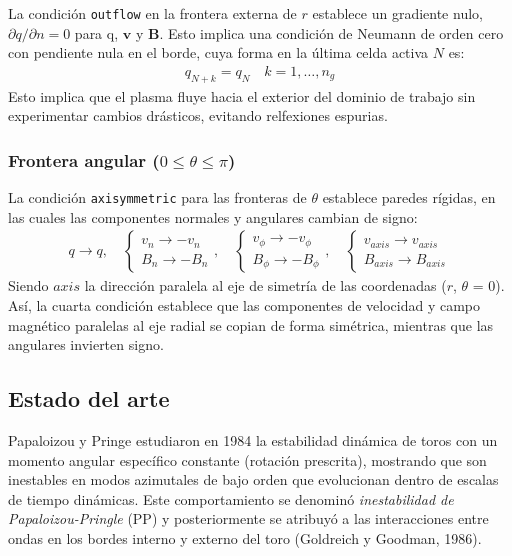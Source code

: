 \documentclass[11pt, letterpaper]{article}
\begin{document}
\medskip

La condición \lstinline[language=C]{outflow} en la frontera externa de $r$ establece un gradiente nulo, $\partial q / \partial n = 0$ para q, $\mathbf{v}$ y $\mathbf{B}$. Esto implica una condición de Neumann de orden cero con pendiente nula en el borde, cuya forma en la última celda activa $N$ es:
\begin{align*}
    q_{N + k} = q_N \quad k = 1, \ldots, n_g 
\end{align*}
Esto implica que el plasma fluye hacia el exterior del dominio de trabajo sin experimentar cambios drásticos, evitando relfexiones espurias.

\subsubsection{\texorpdfstring{Frontera angular ($0 \leq \theta \leq \pi$)}
  {Frontera angular (0 <= theta <= pi)}}

La condición \lstinline[language=C]{axisymmetric} para las fronteras de $\theta$ establece paredes rígidas, en las cuales las componentes normales y angulares cambian de signo:
\begin{align*}
    q \to q, 
    \quad 
    \left\{\begin{array}{c}
        v_n \to -v_n \\
        B_n \to -B_n
    \end{array}\right. , 
    \quad 
    \left\{\begin{array}{c}
        v_\phi \to -v_\phi \\
        B_\phi \to -B_\phi
    \end{array}\right. ,
    \quad 
    \left\{\begin{array}{c}
        v_{axis} \to v_{axis} \\
        B_{axis} \to B_{axis}
    \end{array}\right.
\end{align*}
Siendo $axis$ la dirección paralela al eje de simetría de las coordenadas ($r$, $\theta$ = 0). Así, la cuarta condición establece que las componentes de velocidad y campo magnético paralelas al eje radial se copian de forma simétrica, mientras que las angulares invierten signo.

\subsection{Estado del arte}

Papaloizou y Pringe\cite{Papaloizou} estudiaron en 1984 la estabilidad dinámica de toros con un momento angular específico constante (rotación prescrita), mostrando que son inestables en modos azimutales de bajo orden que evolucionan dentro de escalas de tiempo dinámicas. Este comportamiento se denominó \textit{inestabilidad de Papaloizou-Pringle} (PP) y posteriormente se atribuyó a las interacciones entre ondas en los bordes interno y externo del toro (Goldreich y Goodman, 1986)\cite{Goldreich}.
\end{document}
